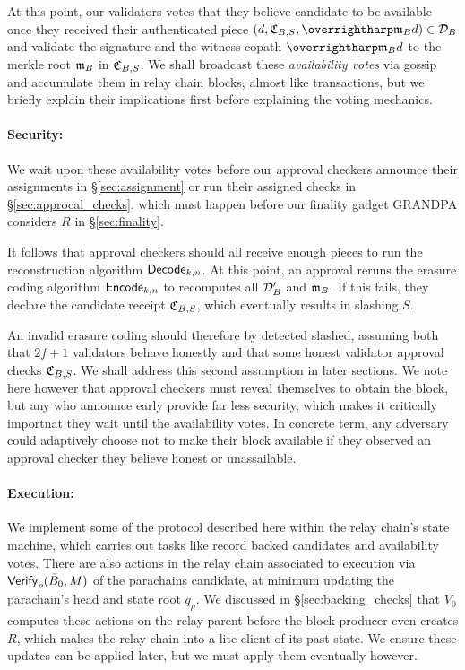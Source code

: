At this point, our validators votes that they believe candidate to be available once they received their authenticated piece $(d,\receipt_{B,S},\vect{\merkleroot_B d}) \in \pieces_B$ and validate the signature 
 and the witness copath $\vect{\merkleroot_B d}$ to the merkle root $\mathfrak{m}_B$ in $\mathfrak{C}_{B,S}$.  We shall broadcast these {\em availability votes} via gossip and accumulate them in relay chain blocks, almost like transactions, but we briefly explain their implications first before explaining the voting mechanics.

\smallskip
\paragraph{Security:}

We wait upon these availability votes before our approval checkers announce their assignments in \S\ref{sec:assignment} or run their assigned checks in \S\ref{sec:approcal_checks}, which must happen before our finality gadget GRANDPA considers $R$ in \S\ref{sec:finality}. 
 
It follows that approval checkers should all receive enough pieces to run the reconstruction algorithm $\mathsf{Decode}_{k,n}$.  At this point, an approval reruns the erasure coding algorithm $\mathsf{Encode}_{k,n}$ to  recomputes all $\mathcal{D}'_B$ and $\mathfrak{m}_B$.  If this fails, they declare the candidate receipt $\mathfrak{C}_{B,S}$, which eventually results in slashing $S$.  

An invalid erasure coding should therefore by detected slashed, assuming both that $2f+1$ validators behave honestly and that some honest validator approval checks $\mathfrak{C}_{B,S}$.
%
We shall address this second assumption in later sections.  We note here however that approval checkers must reveal themselves to obtain the block, but any who announce early provide far less security, which makes it critically importnat they wait until the availability votes.  In concrete term, any adversary could adaptively choose not to make their block available if they observed an approval checker they believe honest or unassailable.  

\smallskip
\paragraph{Execution:}

We implement some of the protocol described here within the relay chain's state machine, which carries out tasks like record backed candidates and availability votes.  
%
There are also actions in the relay chain associated to execution via $\mathsf{Verify}_{\rho}(\bar{B}_0,M)$ of the parachains candidate, at minimum updating the parachain's head and state root $q_\rho$.  We discussed in \S\ref{sec:backing_checks} that $V_0$ computes these actions on the relay parent before the block producer even creates $R$, which makes the relay chain into a lite client of its past state.  We ensure these updates can be applied later, but we must apply them eventually however.

